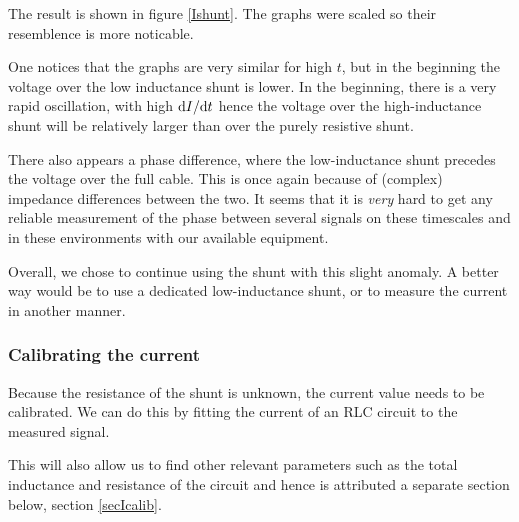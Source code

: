 The result is shown in figure \ref{Ishunt}. The graphs were scaled so their 
resemblence is more noticable.


One notices that the graphs are very similar for high $t$, but in the 
beginning the voltage over the low inductance shunt is lower. In the 
beginning, there is a very rapid oscillation, with high $\mathrm d I / \mathrm d t$ 
hence the voltage over the high-inductance shunt will be relatively larger 
than over the purely resistive shunt.

There also appears a phase difference, where the low-inductance shunt 
precedes the voltage over the full cable. This is once again because of 
(complex) impedance differences between the two. It seems that it is 
\emph{very} hard to get any reliable measurement of the phase between 
several signals on these timescales and in these environments with our 
available equipment.

Overall, we chose to continue using the shunt with this slight anomaly.  A 
better way would be to use a dedicated low-inductance shunt, or to measure 
the current in another manner.



\subsubsection{Calibrating the current}
Because the resistance of the shunt is unknown, the current value needs to 
be calibrated. We can do this by fitting the current of an RLC circuit to 
the measured signal.

This will also allow us to find other relevant parameters such as the total 
inductance and resistance of the circuit and hence is attributed a separate 
section below, section \ref{secIcalib}.


